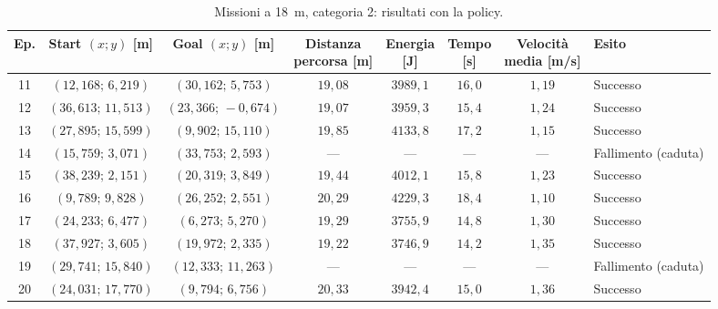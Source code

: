 \begin{table}[H]
\centering
\caption{Missioni a 18~m, categoria 2: risultati con la policy.}
\label{tab:big-map-18m-cat2}
\begingroup
\fontsize{9}{11}\selectfont
\setlength{\tabcolsep}{2.5pt}
\renewcommand{\arraystretch}{1.2}
\begin{tabular}{@{}c cc cccc l@{}}
\toprule
Ep. & \shortstack{Start $(x;y)$\\{}[m]} & \shortstack{Goal $(x;y)$\\{}[m]} & \shortstack{Distanza\\percorsa [m]} & \shortstack{Energia\\{}[J]} & \shortstack{Tempo\\{}[s]} & \shortstack{Velocità\\media [m/s]} & Esito \\
\midrule
11 & $(12{,}168;\,6{,}219)$ & $(30{,}162;\,5{,}753)$ & $19{,}08$ & $3989{,}1$ & $16{,}0$ & $1{,}19$ & Successo \\
12 & $(36{,}613;\,11{,}513)$ & $(23{,}366;\,-0{,}674)$ & $19{,}07$ & $3959{,}3$ & $15{,}4$ & $1{,}24$ & Successo \\
13 & $(27{,}895;\,15{,}599)$ & $(9{,}902;\,15{,}110)$ & $19{,}85$ & $4133{,}8$ & $17{,}2$ & $1{,}15$ & Successo \\
14 & $(15{,}759;\,3{,}071)$ & $(33{,}753;\,2{,}593)$ & --- & --- & --- & --- & Fallimento (caduta) \\
15 & $(38{,}239;\,2{,}151)$ & $(20{,}319;\,3{,}849)$ & $19{,}44$ & $4012{,}1$ & $15{,}8$ & $1{,}23$ & Successo \\
16 & $(9{,}789;\,9{,}828)$ & $(26{,}252;\,2{,}551)$ & $20{,}29$ & $4229{,}3$ & $18{,}4$ & $1{,}10$ & Successo \\
17 & $(24{,}233;\,6{,}477)$ & $(6{,}273;\,5{,}270)$ & $19{,}29$ & $3755{,}9$ & $14{,}8$ & $1{,}30$ & Successo \\
18 & $(37{,}927;\,3{,}605)$ & $(19{,}972;\,2{,}335)$ & $19{,}22$ & $3746{,}9$ & $14{,}2$ & $1{,}35$ & Successo \\
19 & $(29{,}741;\,15{,}840)$ & $(12{,}333;\,11{,}263)$ & --- & --- & --- & --- & Fallimento (caduta) \\
20 & $(24{,}031;\,17{,}770)$ & $(9{,}794;\,6{,}756)$ & $20{,}33$ & $3942{,}4$ & $15{,}0$ & $1{,}36$ & Successo \\
\bottomrule
\end{tabular}
\endgroup
\end{table}

